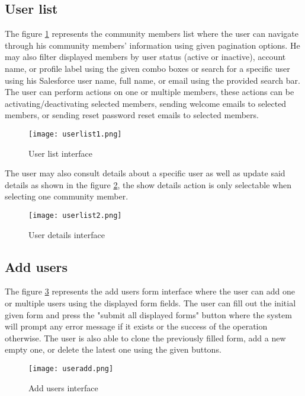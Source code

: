 \subsection{User list }
The figure \ref{userlist1} represents the community members list where the user can navigate through his community members' information using given pagination options. He may also filter displayed members by user status (active or inactive), account name, or profile label using the given combo boxes or search for a specific user using his Salesforce user name, full name, or email using the provided search bar. The user can perform actions on one or multiple members, these actions can be activating/deactivating selected members, sending welcome emails to selected members, or sending reset password reset emails to selected members. 

\begin{figure}[H]%
    \center   
    \texttt{[image: userlist1.png]}
    \caption{User list interface}
    \label{userlist1}
\end{figure}
The user may also consult details about a specific user as well as update said details as shown in the figure \ref{userlist2}, the show details action is only selectable when selecting one community member.
\begin{figure}[H]%
    \center   
    \texttt{[image: userlist2.png]}
    \caption{User details interface}
    \label{userlist2}
\end{figure}

\subsection{Add users}
The figure \ref{useradd} represents the add users form interface where the user can add one or multiple users using the displayed form fields. The user can fill out the initial given form and press the "submit all displayed forms" button where the system will prompt any error message if it exists or the success of the operation otherwise. The user is also able to clone the previously filled form, add a new empty one, or delete the latest one using the given buttons.
\begin{figure}[H]%
    \center   
    
    \texttt{[image: useradd.png]}
    \caption{Add users interface}
    \label{useradd}
\end{figure}
